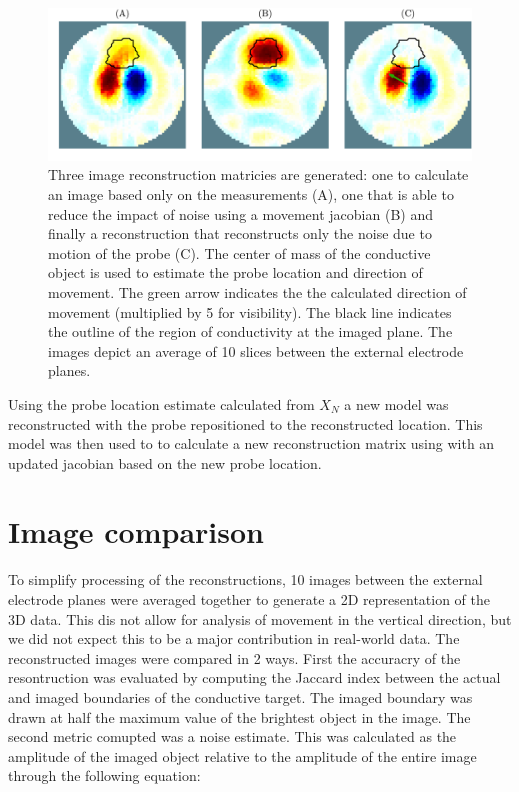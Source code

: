 \begin{figure}
    \centering
   \includegraphics[width=\textwidth]{chapter7-internal_elec_motion/imgs/recon_methods.pdf} 
   \caption[Motion correction methods]{\label{fig:motion_correction_methods} 
	Three image reconstruction matricies are generated: one to calculate an image based 
	only on the measurements (A), one that is able to reduce the impact of noise using a 
	movement jacobian (B) and finally a reconstruction that reconstructs only the noise 
	due to motion of the probe (C). The center of mass of the conductive object is used to
	estimate the probe location and direction of movement. The green arrow indicates the 
	the calculated direction of movement (multiplied by 5 for visibility).
	The black line indicates the outline of the region of conductivity at the imaged plane.
	The images depict an average of 10 slices between the external electrode planes.}
\end{figure}

Using the probe location estimate calculated from $X_N$
a new model was reconstructed with the probe repositioned 
to the reconstructed location. 
This model was then used to to calculate a new reconstruction matrix 
using 
with an updated jacobian based on the new probe location. 


\section{Image comparison}
To simplify processing of the reconstructions, 10 images between the 
external electrode planes were averaged together to generate a 2D 
representation of the 3D data. This dis not allow for analysis of movement in the vertical 
direction, but we did not expect this to be a major contribution in real-world data.
The reconstructed images were compared in 2 ways. First the accuracry of the resontruction
was evaluated by computing the Jaccard index between the actual and imaged boundaries of the 
conductive target. The imaged boundary was drawn at half the maximum value of the brightest 
object in the image. The second metric comupted was a noise estimate. This was calculated as
the amplitude of the imaged object relative to the amplitude of the entire image through the
following equation:

